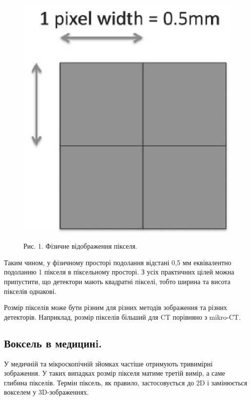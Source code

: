 \documentclass[11pt]{article}
\begin{document}
    \begin{figure}
        \label{fig:image1}
        \centering
        \includegraphics[scale=0.5]{image1.png}

        Рис. 1. Фізичне відображення пікселя.
    \end{figure}

    Таким чином, у фізичному просторі подолання відстані 0,5 мм еквівалентно подоланню 1 пікселя в піксельному просторі.
    З усіх практичних цілей можна припустити, що детектори мають квадратні пікселі, тобто ширина та висота пікселів однакові.

    Розмір пікселів може бути різним для різних методів зображення та різних детекторів.
    Наприклад, розмір пікселів більший для CT порівняно з mikro-CT.

    \subsection{Воксель в медицинi.}\label{subsec:voxel_med}
    У медичній та мікроскопічній зйомках частіше отримують тривимірні зображення.
    У таких випадках розмір пікселя матиме третій вимір, а саме глибина пікселів.
    Термін піксель, як правило, застосовується до 2D і замінюється вокселем у 3D-зображеннях.
\end{document}
